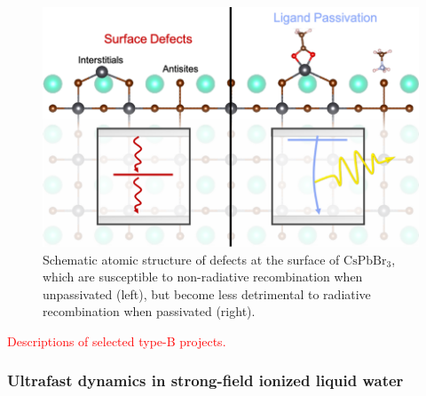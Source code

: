 \begin{figure}[h]
	\centering
	\includegraphics{figures/defect_passivation}
	\caption{
		Schematic atomic structure of defects at the surface of \(\mathrm{CsPbBr_3}\), which are susceptible to non-radiative recombination when unpassivated (left), but become less detrimental to radiative recombination when passivated (right).
	}
	\label{fig:defect}
\end{figure}

\textcolor{red}{Descriptions of selected type-B projects.}

\subsubsection{Ultrafast dynamics in strong-field ionized liquid water} 


